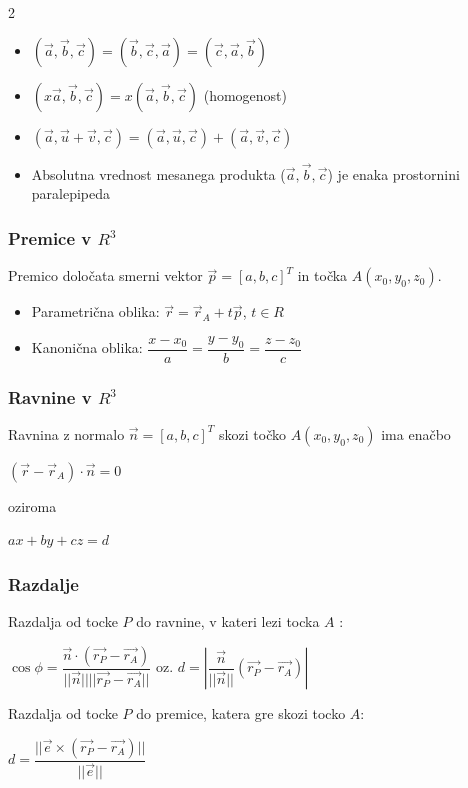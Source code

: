 \documentclass{article}
\begin{document}
\begin{multicols}{2}
	\begin{itemize}
		\item $(\vec{a}, \vec{b}, \vec{c}) = (\vec{b}, \vec{c}, \vec{a}) = (\vec{c}, \vec{a}, \vec{b})$
		\item $(x\vec{a}, \vec{b}, \vec{c}) = x(\vec{a}, \vec{b}, \vec{c})$ (homogenost)
		\item $(\vec{a}, \vec{u} + \vec{v}, \vec{c}) = (\vec{a}, \vec{u}, \vec{c}) + (\vec{a}, \vec{v}, \vec{c})$
		\item Absolutna vrednost mesanega produkta ($\vec{a}, \vec{b}, \vec{c}$) je enaka prostornini paralepipeda
	\end{itemize}

	\subsubsection{Premice v $R^{3}$}

	Premico določata smerni vektor $\vec{p} = [a, b, c]^{T}$ in točka $A(x_0, y_0, z_0)$.
	\begin{itemize}
		\item Parametrična oblika:
		      $\vec{r} = \vec{r}_{A} + t\vec{p}$, $t \in R$
		\item Kanonična oblika:
		      $\dfrac{x - x_{0}}{a} = \dfrac{y - y_{0}}{b} = \dfrac{z - z_{0}}{c}$
	\end{itemize}

	\subsubsection{Ravnine v $R^{3}$}

	Ravnina z normalo $\vec{n} = [a, b, c]^T$ skozi točko $A(x_0, y_0, z_0)$ ima enačbo
	\begin{center}
		$(\vec{r} - \vec{r}_A) \cdot \vec{n} = 0$
	\end{center}
	oziroma
	\begin{center}
		$ax + by + cz = d$
	\end{center}

	\subsubsection{Razdalje}

	Razdalja od tocke $P$ do ravnine, v kateri lezi tocka $A$ :
	\begin{center}
		$\cos\phi = \dfrac{\vec{n} \cdot ( \vec{r_{P}} - \vec{r_{A}})} {||\vec{n}|| ||\vec{r_{P}} - \vec{r_{A}}||}$ oz.
		$d = |\dfrac{\vec{n}}{||\vec{n}||} ( \vec{r_{P}} - \vec{r_{A}})|$
	\end{center}
	Razdalja od tocke $P$ do premice, katera gre skozi tocko $A$:
	\begin{center}
		$d = \dfrac{||\vec{e} \times ( \vec{r_{P}} - \vec{r_{A}})||}{||\vec{e}||}$
	\end{center}


\end{multicols}
\end{document}
